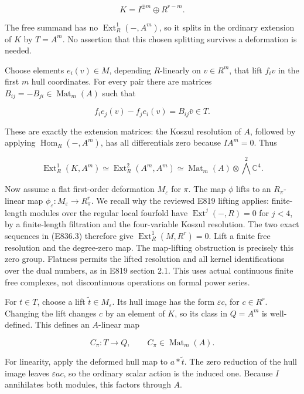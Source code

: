 \[
 K=I^{\oplus m}\oplus R^{r-m}.
 \tag{E836.5}
\]

The free summand has no \(\operatorname{Ext}^1_R(-,A^m)\), so it splits
in the ordinary extension of \(K\) by \(T=A^m\). No assertion that this
chosen splitting survives a deformation is needed.

Choose elements \(e_i(v)\in M\), depending \(R\)-linearly on
\(v\in R^m\), that lift \(f_i v\) in the first \(m\) hull coordinates.
For every pair there are matrices
\(B_{ij}=-B_{ji}\in\operatorname{Mat}_m(A)\) such that

\[
 f_i e_j(v)-f_j e_i(v)=B_{ij}\bar v\in T.
 \tag{E836.6}
\]

These are exactly the extension matrices: the Koszul resolution of
\(A\), followed by applying \(\operatorname{Hom}_R(-,A^m)\), has all
differentials zero because \(I A^m=0\). Thus

\[
 \operatorname{Ext}^1_R(K,A^m)
   \simeq\operatorname{Ext}^2_R(A^m,A^m)
   \simeq\operatorname{Mat}_m(A)\otimes\bigwedge^2\mathbb C^4.
 \tag{E836.7}
\]

Now assume a flat first-order deformation \(M_\varepsilon\) for \(\pi\).
The map \(\phi\) lifts to an \(R_\pi\)-linear map
\(\phi_\varepsilon:M_\varepsilon\to R_\pi^r\). We recall why the
reviewed E819 lifting applies: finite-length modules over the regular
local fourfold have \(\operatorname{Ext}^j(-,R)=0\) for \(j<4\), by a
finite-length filtration and the four-variable Koszul resolution. The
two exact sequences in (E836.3) therefore give
\(\operatorname{Ext}^1_R(M,R^r)=0\). Lift a finite free resolution and
the degree-zero map. The map-lifting obstruction is precisely this zero
group. Flatness permits the lifted resolution and all kernel
identifications over the dual numbers, as in E819 section 2.1. This uses
actual continuous finite free complexes, not discontinuous operations on
formal power series.

For \(t\in T\), choose a lift \(\widetilde t\in M_\varepsilon\). Its
hull image has the form \(\varepsilon c\), for \(c\in R^r\). Changing
the lift changes \(c\) by an element of \(K\), so its class in \(Q=A^m\)
is well-defined. This defines an \(A\)-linear map

\[
 C_\pi:T\longrightarrow Q,
 \qquad C_\pi\in\operatorname{Mat}_m(A).
 \tag{E836.8}
\]

For linearity, apply the deformed hull map to \(a*\widetilde t\). The
zero reduction of the hull image leaves \(\varepsilon ac\), so the
ordinary scalar action is the induced one. Because \(I\) annihilates
both modules, this factors through \(A\).


